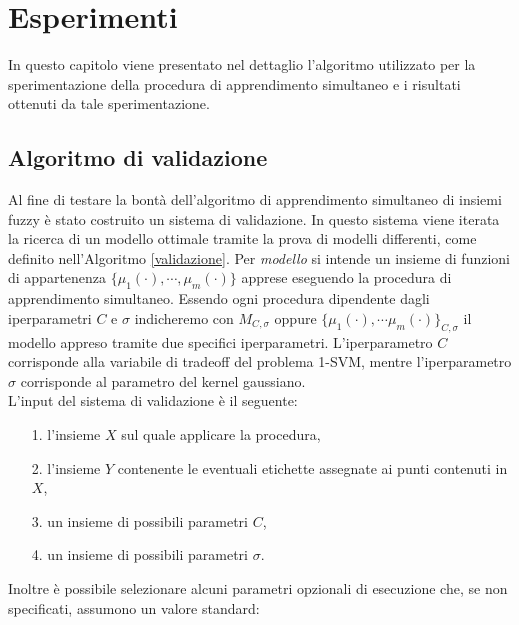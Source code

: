 \documentclass [11pt,a4paper,twoside,openright] {book}
\begin{document}
\section{Esperimenti}
In questo capitolo viene presentato nel dettaglio l'algoritmo utilizzato per la sperimentazione della procedura di apprendimento simultaneo e i risultati ottenuti da tale sperimentazione.
\subsection{Algoritmo di validazione}
Al fine di testare la bontà dell'algoritmo di apprendimento simultaneo di insiemi fuzzy è stato costruito un sistema di validazione. In questo sistema viene iterata la ricerca di un modello ottimale tramite la prova di modelli differenti, come definito nell'Algoritmo \ref{validazione}. Per \textit{modello} si intende un insieme di funzioni di appartenenza $\lbrace \mu_1(\cdot), \cdots, \mu_m(\cdot) \rbrace$ apprese eseguendo la procedura di apprendimento simultaneo. Essendo ogni procedura dipendente dagli iperparametri $C$ e $\sigma$ indicheremo con $M_{C,\sigma}$ oppure $\lbrace \mu_1(\cdot), \cdots \mu_m(\cdot) \rbrace_{C,\sigma}$ il modello appreso tramite due specifici iperparametri. L'iperparametro $C$ corrisponde alla variabile di tradeoff del problema 1-SVM, mentre l'iperparametro $\sigma$ corrisponde al parametro del kernel gaussiano.\\
L'input del sistema di validazione è il seguente:
\begin{enumerate}
\item[1.] l'insieme $X$ sul quale applicare la procedura,
\item[2.] l'insieme $Y$ contenente le eventuali etichette assegnate ai punti contenuti in $X$,
\item[3.] un insieme di possibili parametri $C$,
\item[4.] un insieme di possibili parametri $\sigma$.
\end{enumerate}
Inoltre è possibile selezionare alcuni parametri opzionali di esecuzione che, se non specificati, assumono un valore standard:
\end{document}
